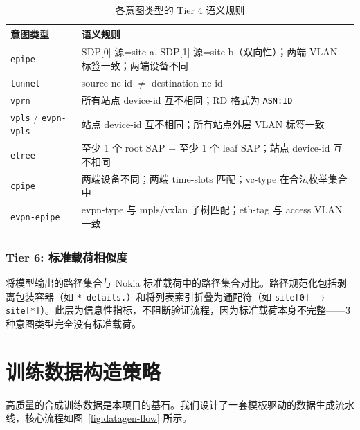 \documentclass[12pt, a4paper]{article}
\newcommand{\intenttype}[1]{\texttt{#1}}
\begin{document}
\begin{table}[H]
\centering
\caption{各意图类型的 Tier 4 语义规则}
\label{tab:semantic-rules}
\small
\begin{tabular}{lp{10.5cm}}
\toprule
\textbf{意图类型} & \textbf{语义规则} \\
\midrule
\intenttype{epipe} &
  SDP[0] 源=site-a, SDP[1] 源=site-b（双向性）；两端 VLAN 标签一致；两端设备不同 \\
\intenttype{tunnel} &
  source-ne-id $\neq$ destination-ne-id \\
\intenttype{vprn} &
  所有站点 device-id 互不相同；RD 格式为 \texttt{ASN:ID} \\
\intenttype{vpls} / \intenttype{evpn-vpls} &
  站点 device-id 互不相同；所有站点外层 VLAN 标签一致 \\
\intenttype{etree} &
  至少 1 个 root SAP + 至少 1 个 leaf SAP；站点 device-id 互不相同 \\
\intenttype{cpipe} &
  两端设备不同；两端 time-slots 匹配；vc-type 在合法枚举集合中 \\
\intenttype{evpn-epipe} &
  evpn-type 与 mpls/vxlan 子树匹配；eth-tag 与 access VLAN 一致 \\
\bottomrule
\end{tabular}
\end{table}

\subsubsection{Tier 6: 标准载荷相似度}
\label{sec:tier6}

将模型输出的路径集合与 Nokia 标准载荷中的路径集合对比。路径规范化包括剥离包装容器（如 \texttt{*-details.}）和将列表索引折叠为通配符（如 \texttt{site[0]} $\to$ \texttt{site[*]}）。此层为信息性指标，不阻断验证流程，因为标准载荷本身不完整——3 种意图类型完全没有标准载荷。

\section{训练数据构造策略}
\label{sec:data-generation}

高质量的合成训练数据是本项目的基石。我们设计了一套模板驱动的数据生成流水线，核心流程如图~\ref{fig:datagen-flow} 所示。
\end{document}
